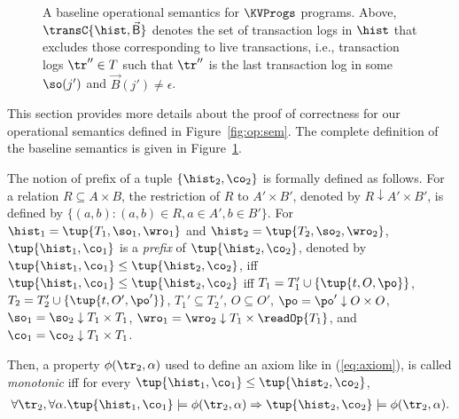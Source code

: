 \begin{figure} [t]
\begin{mathpar}
    
  \end{mathpar}
  \caption{A baseline operational semantics for $\KVProgs$ programs. Above, $\transC{\hist,\vec{\mathsf{B}}}$ denotes the set of transaction logs in $\hist$ that excludes those corresponding to live transactions, i.e., transaction logs $\tr''\in T$ such that $\tr''$ is the last transaction log in some $\so(j')$ and $\vec{B}(j')\neq\epsilon$.}
  \label{fig:op:sem:baseline:complete}
\end{figure}

This section provides more details about the proof of correctness for our operational semantics defined in Figure~\ref{fig:op:sem}. The complete definition of the baseline semantics is given in Figure~\ref{fig:op:sem:baseline:complete}.

The notion of prefix of a tuple $\{\hist_2,\co_2\}$ is formally defined as follows. For a relation $R\subseteq A\times B$, the restriction of $R$ to $A'\times B'$, denoted by $R\downarrow A'\times B'$, is defined by $\{(a,b): (a,b)\in R, a\in A', b\in B'\}$.
For $\hist_1=\tup{T_1, \so_1, \wro_1}$ and $\hist_2=\tup{T_2, \so_2, \wro_2}$, $\tup{\hist_1,\co_1}$ is a \emph{prefix} of $\tup{\hist_2,\co_2}$, denoted by $\tup{\hist_1,\co_1}\leq \tup{\hist_2,\co_2}$, iff $\tup{\hist_1,\co_1}\leq \tup{\hist_2,\co_2}$ iff $T_1=T_1'\cup\{\tup{t,O,\po}\}$, $T_2=T_2'\cup\{\tup{t,O',\po'}\}$, $T_1'\subseteq T_2'$, $O\subseteq O'$, $\po = \po' \downarrow O\times O$, $\so_1 = \so_2 \downarrow T_1\times T_1$, $\wro_1= \wro_2\downarrow T_1\times \readOp{T_1}$, and $\co_1= \co_2\downarrow T_1\times T_1$.

Then, a property $\phi(\tr_2,\alpha)$ used to define an axiom like in (\ref{eq:axiom}), is called \emph{monotonic} iff 
for every  $\tup{\hist_1,\co_1}\leq \tup{\hist_2,\co_2}$, 
\begin{align*}
\forall \tr_2, \forall \alpha. \tup{\hist_1,\co_1}\models \phi(\tr_2,\alpha) \Rightarrow  \tup{\hist_2,\co_2}\models \phi(\tr_2,\alpha).
\end{align*}

